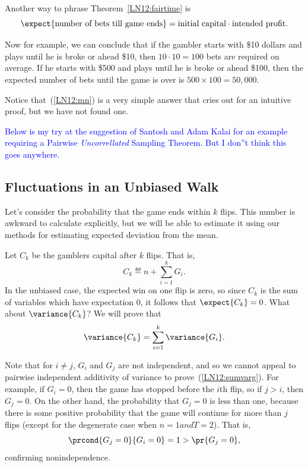 \begin{staffnotes}
Another way to phrase Theorem~\ref{LN12:fairtime} is
\begin{equation}\label{LN12:mn}
\expect{\text{number of bets till game ends}} = \text{initial capital}
\cdot \text{intended profit}.
\end{equation}

Now for example, we can conclude that if the gambler starts with \$10
dollars and plays until he is broke or ahead \$10, then $10 \cdot 10 = 100$
bets are required on average.  If he starts with \$500 and plays until he
is broke or ahead \$100, then the expected number of bets until the game is
over is $500 \times 100 = 50,000$.

Notice that~(\ref{LN12:mn}) is a very simple answer that cries out for an
intuitive proof, but we have not found one.

\end{staffnotes}

\iffalse

\textcolor{blue}{Below is my try at the suggestion of Santosh and Adam
  Kalai for an example requiring a Pairwise \emph{Uncorrellated}
  Sampling Theorem.  But I don''t think this goes anywhere.}

\subsection{Fluctuations in an Unbiased Walk}

Let's consider the probability that the game ends within $k$ flips.  This
number is awkward to calculate explicitly, but we will be able to estimate
it using our methods for estimating expected deviation from the mean.

Let $C_k$ be the gamblers capital after $k$ flips.  That is,
\[
C_k \eqdef n + \sum_{i=1}^k G_i.
\]
In the unbiased case, the expected win on one flip is zero, so since $C_k$
is the sum of variables which have expectation 0, it follows that
$\expect{C_k} = 0$.  What about $\variance{C_k}$?  We will prove that
\begin{equation}\label{LN12:sumvarg}
\variance{C_k} = \sum_{i=1}^k \variance{G_i}.
\end{equation}

Note that for $i \neq j$, $G_i$ and $G_j$ are not independent, and so we
cannot appeal to pairwise independent additivity of variance to
prove~(\ref{LN12:sumvarg}).  For example, if $G_i = 0$, then the game has
stopped before the $i$th flip, so if $j > i$, then $G_j = 0$.  On the
other hand, the probability that $G_j = 0$ is less than one, because there
is some positive probability that the game will continue for more than $j$
flips (except for the degenerate case when $n=1 and T=2$).  That is,
\[
\prcond{G_j = 0}{G_i = 0} = 1 > \pr{G_j = 0},
\]
confirming nonindependence.

